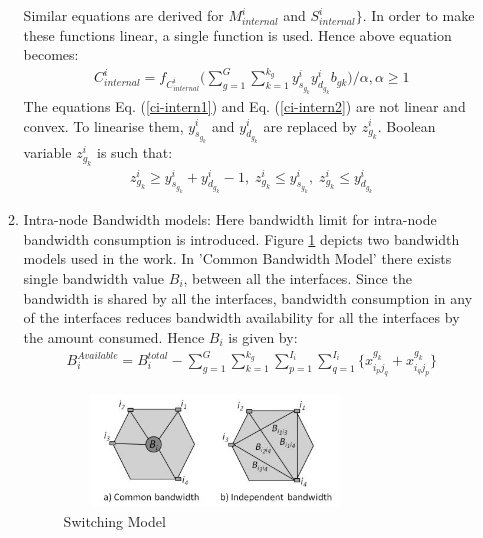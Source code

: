 \documentclass[article,dr=phil,type=msc ,colorback,accentcolor=tud4b]{tudthesis}
\begin{document}
\begin{enumerate}[label=(\Alph*)]
\begin{enumerate}
Similar equations are derived for  $M^{i}_{internal}$ and $S^{i}_{internal} \}$. In order to make these functions linear, a single function is used. Hence above equation becomes:
\begin{equation} \label{ci-intern2}
\begin{split}
C^{i}_{internal} = f_{C^{i}_{internal}} \big( \sum_{g=1}^{G} \sum_{k=1}^{k_{g}} y^{i}_{s_{g_{k}}} y^{i}_{d_{g_{k}}} b_{gk}\big)/\alpha, \alpha \geq 1
\end{split}
\end{equation}
The equations Eq. (\ref{ci-intern1}) and Eq. (\ref{ci-intern2}) are not linear and convex. To linearise them, $ y^{i}_{s_{g_{k}}}$ and $y^{i}_{d_{g_{k}}}$ are replaced by $z^{i}_{g_{k}}$. Boolean variable $z^{i}_{g_{k}}$ is such that:
\begin{equation} 
\begin{split}
z^{i}_{g_{k}} \geq y^{i}_{s_{g_{k}}} + y^{i}_{d_{g_{k}}} -1, \; z^{i}_{g_{k}} \leq y^{i}_{s_{g_{k}}}, \; z^{i}_{g_{k}} \leq y^{i}_{d_{g_{k}}}
\end{split}
\end{equation}
\item  Intra-node Bandwidth models: Here bandwidth limit for intra-node bandwidth consumption is introduced. Figure \ref{fig: bw_model} depicts two bandwidth models used in the work. In 'Common Bandwidth Model' there exists single bandwidth value $B_{i}$, between all the interfaces. Since the bandwidth is shared by all the interfaces, bandwidth consumption in any of the interfaces reduces bandwidth availability for all the interfaces by the amount consumed. Hence $B_{i}$ is given by:
\begin{equation} 
\begin{split}
B^{Available}_{i} = B^{total}_{i} -  \sum_{g=1}^{G} \sum_{k=1}^{k_{g}} \sum_{p=1}^{I_{i}} \sum_{q=1}^{I_{i}} \{x_{i_{p}j_{q}}^{g_{k}} + x_{i_{q}j_{p}}^{g_{k}}\}
\end{split}
\end{equation}
\begin{figure}[h]
	\centering
	\includegraphics[width=8cm, height=3cm]{bw_model.jpg}
	\caption{Switching Model}
	\label{fig: bw_model}
\end{figure}


\end{enumerate}
\end{enumerate}
\end{document}
